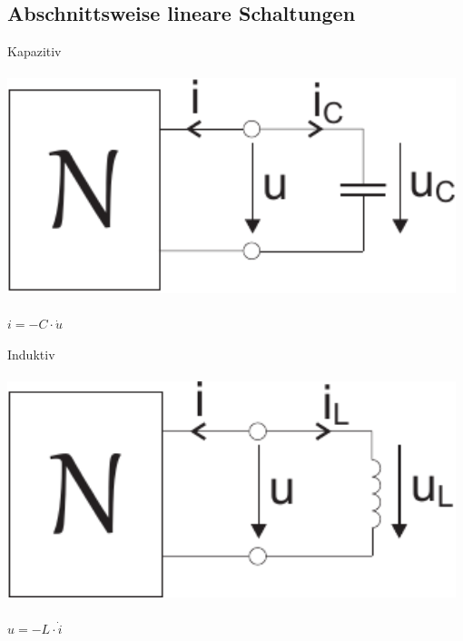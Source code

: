 \documentclass[a4paper,twocolumn,10pt]{article}
\begin{document}
\subsection*{Abschnittsweise lineare Schaltungen}
\begin{minipage}[t]{0.23\textwidth}
Kapazitiv\\\\
\includegraphics[width=0.98\textwidth]{Grafiken/DynamischerPfadN1}\\\\
$i=-C\cdot\dot u$
\end{minipage}
\hfill
\begin{minipage}[t]{0.23\textwidth}
Induktiv\\\\
\includegraphics[width=0.98\textwidth]{Grafiken/DynamischerPfadN2}\\\\
$u=-L\cdot\dot i$
\end{minipage}
\end{document}
